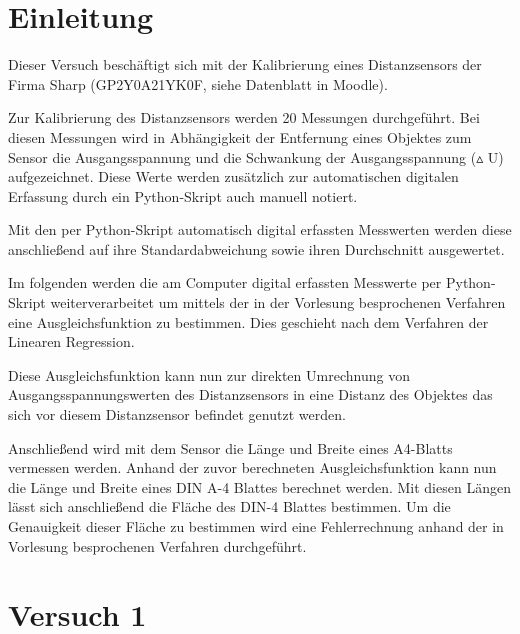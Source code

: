 \documentclass[12pt,oneside,a4paper]{report}
\begin{document}




\clearpage







\setcounter{page}{1}

\chapter{Einleitung}
\label{chap:EINL}
Dieser Versuch beschäftigt sich mit der Kalibrierung eines Distanzsensors der Firma Sharp (GP2Y0A21YK0F, siehe Datenblatt in Moodle).

Zur Kalibrierung des Distanzsensors werden 20 Messungen durchgeführt. Bei diesen Messungen wird in Abhängigkeit der Entfernung eines Objektes zum Sensor die Ausgangsspannung und die Schwankung der Ausgangsspannung ($\vartriangle$ U) aufgezeichnet. Diese Werte werden zusätzlich zur automatischen digitalen Erfassung durch ein Python-Skript auch manuell notiert.

Mit den per Python-Skript automatisch digital erfassten Messwerten werden diese anschließend auf ihre Standardabweichung sowie ihren Durchschnitt ausgewertet.

Im folgenden werden die am Computer digital erfassten Messwerte per Python-Skript weiterverarbeitet um mittels der in der Vorlesung besprochenen Verfahren eine Ausgleichsfunktion zu bestimmen. Dies geschieht nach dem Verfahren der Linearen Regression.

Diese Ausgleichsfunktion kann nun zur direkten Umrechnung von Ausgangsspannungswerten des Distanzsensors in eine Distanz des Objektes das sich vor diesem Distanzsensor befindet genutzt werden.

Anschließend wird mit dem Sensor die Länge und Breite eines A4-Blatts vermessen werden. Anhand der zuvor berechneten Ausgleichsfunktion kann nun die Länge und Breite eines DIN A-4 Blattes berechnet werden.
Mit diesen Längen lässt sich anschließend die Fläche des DIN-4 Blattes bestimmen.
Um die Genauigkeit dieser Fläche zu bestimmen wird eine Fehlerrechnung anhand der in Vorlesung besprochenen Verfahren durchgeführt.


\chapter{Versuch 1}
\label{chap:VERSUCH_1}
\end{document}
